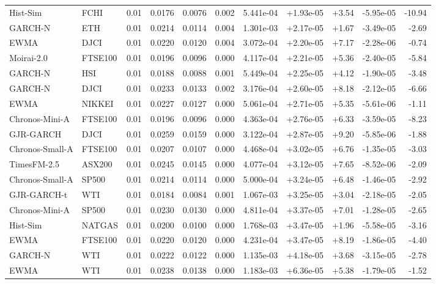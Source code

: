 \begin{tabular}{llrrrrrrrrr}
Hist-Sim & FCHI & 0.01 & 0.0176 & 0.0076 & 0.002 & 5.441e-04 & +1.93e-05 & +3.54 & -5.95e-05 & -10.94 \\
GARCH-N & ETH & 0.01 & 0.0214 & 0.0114 & 0.004 & 1.301e-03 & +2.17e-05 & +1.67 & -3.49e-05 & -2.69 \\
EWMA & DJCI & 0.01 & 0.0220 & 0.0120 & 0.004 & 3.072e-04 & +2.20e-05 & +7.17 & -2.28e-06 & -0.74 \\
Moirai-2.0 & FTSE100 & 0.01 & 0.0196 & 0.0096 & 0.000 & 4.117e-04 & +2.21e-05 & +5.36 & -2.40e-05 & -5.84 \\
GARCH-N & HSI & 0.01 & 0.0188 & 0.0088 & 0.001 & 5.449e-04 & +2.25e-05 & +4.12 & -1.90e-05 & -3.48 \\
GARCH-N & DJCI & 0.01 & 0.0233 & 0.0133 & 0.002 & 3.176e-04 & +2.60e-05 & +8.18 & -2.12e-05 & -6.66 \\
EWMA & NIKKEI & 0.01 & 0.0227 & 0.0127 & 0.000 & 5.061e-04 & +2.71e-05 & +5.35 & -5.61e-06 & -1.11 \\
Chronos-Mini-A & FTSE100 & 0.01 & 0.0196 & 0.0096 & 0.000 & 4.363e-04 & +2.76e-05 & +6.33 & -3.59e-05 & -8.23 \\
GJR-GARCH & DJCI & 0.01 & 0.0259 & 0.0159 & 0.000 & 3.122e-04 & +2.87e-05 & +9.20 & -5.85e-06 & -1.88 \\
Chronos-Small-A & FTSE100 & 0.01 & 0.0207 & 0.0107 & 0.000 & 4.468e-04 & +3.02e-05 & +6.76 & -1.35e-05 & -3.03 \\
TimesFM-2.5 & ASX200 & 0.01 & 0.0245 & 0.0145 & 0.000 & 4.077e-04 & +3.12e-05 & +7.65 & -8.52e-06 & -2.09 \\
Chronos-Small-A & SP500 & 0.01 & 0.0214 & 0.0114 & 0.000 & 5.000e-04 & +3.24e-05 & +6.48 & -1.46e-05 & -2.92 \\
GJR-GARCH-t & WTI & 0.01 & 0.0184 & 0.0084 & 0.001 & 1.067e-03 & +3.25e-05 & +3.04 & -2.18e-05 & -2.05 \\
Chronos-Mini-A & SP500 & 0.01 & 0.0230 & 0.0130 & 0.000 & 4.811e-04 & +3.37e-05 & +7.01 & -1.28e-05 & -2.65 \\
Hist-Sim & NATGAS & 0.01 & 0.0200 & 0.0100 & 0.000 & 1.768e-03 & +3.47e-05 & +1.96 & -5.58e-05 & -3.16 \\
EWMA & FTSE100 & 0.01 & 0.0220 & 0.0120 & 0.000 & 4.231e-04 & +3.47e-05 & +8.19 & -1.86e-05 & -4.40 \\
GARCH-N & WTI & 0.01 & 0.0222 & 0.0122 & 0.000 & 1.135e-03 & +4.18e-05 & +3.68 & -3.15e-05 & -2.78 \\
EWMA & WTI & 0.01 & 0.0238 & 0.0138 & 0.000 & 1.183e-03 & +6.36e-05 & +5.38 & -1.79e-05 & -1.52 \\

\end{tabular}
